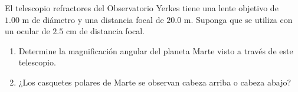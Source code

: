 \item El telescopio refractores del Observatorio Yerkes tiene una lente objetivo de $1.00\text{ m}$ de diámetro y una distancia focal de $20.0\text{ m}$. Suponga que se utiliza con un ocular de $2.5\text{ cm}$ de distancia focal.
\begin{enumerate}
    \item Determine la magnificación angular del planeta Marte visto a través de este telescopio.
    \item ¿Los casquetes polares de Marte se observan cabeza arriba o cabeza abajo?
\end{enumerate}